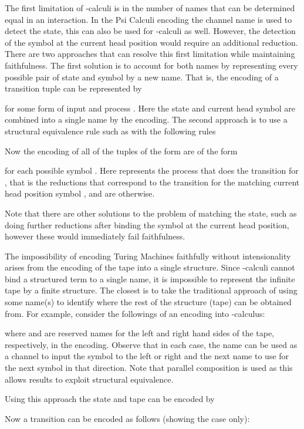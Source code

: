 \documentclass[submission,copyright,creativecommons]{eptcs}
\begin{document}
The first limitation of -calculi is in the number of names that can be determined
equal in an interaction. In the Psi Calculi encoding 
the channel name is used to detect the state, this can also be used for -calculi as
well.
However, the detection of the symbol at the current head position would require an additional
reduction.
There are two approaches that can resolve this first limitation while maintaining faithfulness.
The first solution is to account for both names by representing every possible
pair of state and symbol by a new name. That is, the encoding of a transition tuple
can be represented by

for some form of input  and process . Here the state  and current
head symbol  are combined into a single name  by the encoding.
The second approach is to use a structural equivalence rule such as
 with the following rules

Now the encoding of all of the tuples of the form 
are of the form

for each possible symbol .
Here  represents the process that does the transition for
, that is the reductions that correspond to the
transition for the matching current head position symbol , and are 
otherwise.

Note that there are other solutions to the problem of matching the state, such as
doing further reductions after binding the symbol at the current head position,
however these would immediately fail faithfulness.


The impossibility of encoding Turing Machines faithfully without intensionality
arises from the encoding of the tape into a single structure.
Since -calculi cannot bind a structured term to a single name, it is impossible
to represent the infinite tape by a finite structure.
The closest is to take the traditional approach of using some name(s) to identify
where the rest of the structure (tape) can be obtained from.
For example, consider the followings of an encoding into -calculus:

where  and  are reserved names for the left and right hand sides of the tape, respectively,
in the encoding.
Observe that in each case, the name can be used as a channel to input the symbol to
the left  or right  and the next name to use for the next symbol in that direction.
Note that parallel composition is used as this allows results to exploit structural
equivalence.

Using this approach the state  and tape
 can be encoded by


Now a transition  can be encoded as follows
(showing the  case only):
\end{document}
